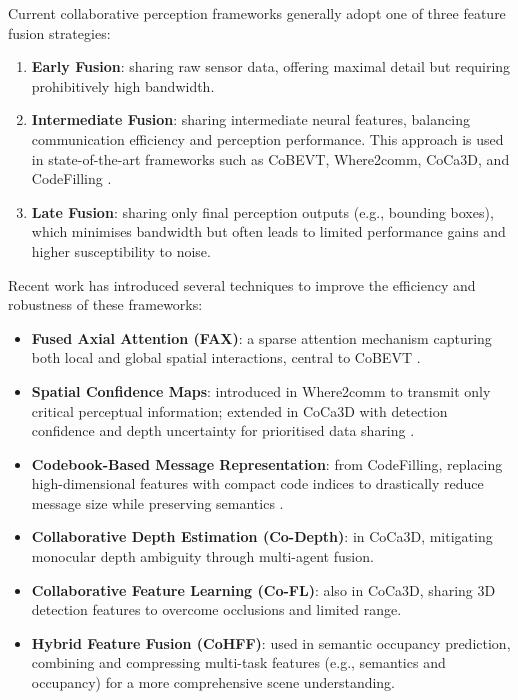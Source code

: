 Current collaborative perception frameworks generally adopt one of three feature fusion strategies:

\begin{enumerate}
\item \textbf{Early Fusion}: sharing raw sensor data, offering maximal detail but requiring prohibitively high bandwidth.
\item \textbf{Intermediate Fusion}: sharing intermediate neural features, balancing communication efficiency and perception performance. This approach is used in state-of-the-art frameworks such as CoBEVT, Where2comm, CoCa3D, and CodeFilling \cite{xu2022cobevtcooperativebirdseye, hu2022where2commcommunicationefficientcollaborativeperception, hu2023collaborationhelpscameraovertake, hu2024communicationefficientcollaborativeperceptioninformation}.
\item \textbf{Late Fusion}: sharing only final perception outputs (e.g., bounding boxes), which minimises bandwidth but often leads to limited performance gains and higher susceptibility to noise.
\end{enumerate}

Recent work has introduced several techniques to improve the efficiency and robustness of these frameworks:

\begin{itemize}
\item \textbf{Fused Axial Attention (FAX)}: a sparse attention mechanism capturing both local and global spatial interactions, central to CoBEVT \cite{xu2022cobevtcooperativebirdseye}.
\item \textbf{Spatial Confidence Maps}: introduced in Where2comm to transmit only critical perceptual information; extended in CoCa3D with detection confidence and depth uncertainty for prioritised data sharing \cite{hu2022where2commcommunicationefficientcollaborativeperception, hu2023collaborationhelpscameraovertake}.
\item \textbf{Codebook-Based Message Representation}: from CodeFilling, replacing high-dimensional features with compact code indices to drastically reduce message size while preserving semantics \cite{hu2024communicationefficientcollaborativeperceptioninformation}.
\item \textbf{Collaborative Depth Estimation (Co-Depth)}: in CoCa3D, mitigating monocular depth ambiguity through multi-agent fusion.
\item \textbf{Collaborative Feature Learning (Co-FL)}: also in CoCa3D, sharing 3D detection features to overcome occlusions and limited range.
\item \textbf{Hybrid Feature Fusion (CoHFF)}: used in semantic occupancy prediction, combining and compressing multi-task features (e.g., semantics and occupancy) for a more comprehensive scene understanding.
\end{itemize}

